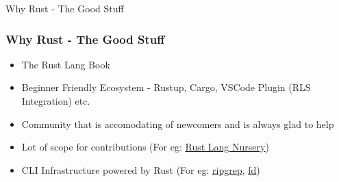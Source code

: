 \begin{section}{Why Rust - The Good Stuff}
  \begin{frame}
    \frametitle{Why Rust - The Good Stuff}
    \begin{itemize}
    \item The Rust Lang Book \cite{RustLangEd}
    \item Beginner Friendly Ecosystem - Rustup, Cargo, VSCode Plugin (RLS Integration) etc.
    \item Community that is accomodating of newcomers and is always glad to help
    \item Lot of scope for contributions (For eg: \href{https://github.com/rust-lang-nursery/}{Rust Lang Nursery})
    \item CLI Infrastructure powered by Rust (For eg: \href{https://github.com/BurntSushi/riggrep/}{ripgrep}, \href{https://github.com/sharkdp/fd/}{fd})
    \end{itemize}
  \end{frame}
\end{section}

